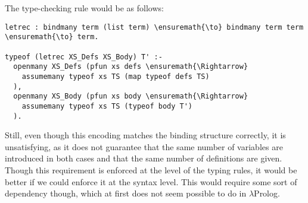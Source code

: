 The type-checking rule would be as follows:

\begin{verbatim}
letrec : bindmany term (list term) \ensuremath{\to} bindmany term term \ensuremath{\to} term.

typeof (letrec XS_Defs XS_Body) T' :-
  openmany XS_Defs (pfun xs defs \ensuremath{\Rightarrow}
    assumemany typeof xs TS (map typeof defs TS)
  ),
  openmany XS_Body (pfun xs body \ensuremath{\Rightarrow}
    assumemany typeof xs TS (typeof body T')
  ).
\end{verbatim}

Still, even though this encoding matches the binding structure
correctly, it is unsatisfying, as it does not guarantee that the same
number of variables are introduced in both cases and that the same
number of definitions are given. Though this requirement is enforced at
the level of the typing rules, it would be better if we could enforce it
at the syntax level. This would require some sort of dependency though,
which at first does not seem possible to do in \ensuremath{\lambda}Prolog.
